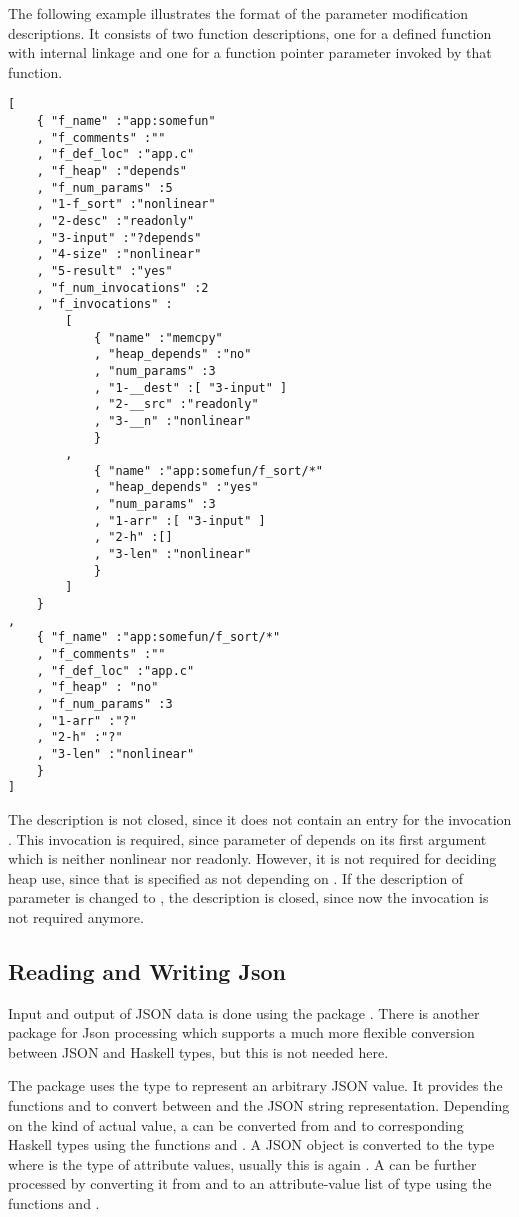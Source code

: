 The following example illustrates the format of the parameter modification descriptions. It consists of two
function descriptions, one for a defined function with internal linkage and one for a function pointer parameter
invoked by that function.
\begin{verbatim}
[
    { "f_name" :"app:somefun" 
    , "f_comments" :"" 
    , "f_def_loc" :"app.c" 
    , "f_heap" :"depends"
    , "f_num_params" :5
    , "1-f_sort" :"nonlinear" 
    , "2-desc" :"readonly" 
    , "3-input" :"?depends" 
    , "4-size" :"nonlinear" 
    , "5-result" :"yes" 
    , "f_num_invocations" :2
    , "f_invocations" :
        [ 
            { "name" :"memcpy" 
            , "heap_depends" :"no"
            , "num_params" :3
            , "1-__dest" :[ "3-input" ]
            , "2-__src" :"readonly" 
            , "3-__n" :"nonlinear" 
            } 
        , 
            { "name" :"app:somefun/f_sort/*" 
            , "heap_depends" :"yes"
            , "num_params" :3
            , "1-arr" :[ "3-input" ]
            , "2-h" :[]
            , "3-len" :"nonlinear" 
            } 
        ] 
    } 
, 
    { "f_name" :"app:somefun/f_sort/*"
    , "f_comments" :"" 
    , "f_def_loc" :"app.c"
    , "f_heap" : "no"
    , "f_num_params" :3
    , "1-arr" :"?" 
    , "2-h" :"?" 
    , "3-len" :"nonlinear" 
    } 
]
\end{verbatim}
The description is not closed, since it does not contain an entry for the invocation . This
invocation is required, since parameter  of  depends on its first argument
which is neither nonlinear nor readonly. However, it is not required for deciding heap use, since that
is specified as not depending on . If the description of parameter  is changed
to , the description is closed, since now the invocation  is not required
anymore.

\subsection{Reading and Writing Json}
\label{impl-parmod-json}

Input and output of JSON data is done using the package . There is another package  for
Json processing which supports a much more flexible conversion between JSON and Haskell types, but this is not
needed here.

The package  uses the type  to represent an arbitrary JSON value. It provides the functions
 and  to convert between  and the JSON string representation. Depending
on the kind of actual value, a  can be converted from and to corresponding Haskell types using
the functions  and . A JSON object is converted to the type  where
 is the type of attribute values, usually this is again . A  can be further
processed by converting it from and to an attribute-value list of type \code{[(String,a)]} using the functions
 and .

